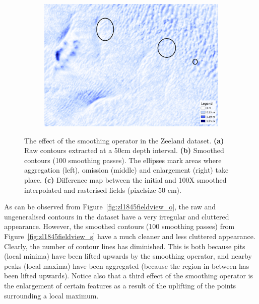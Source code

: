 \begin{figure}
\begin{subfigure}[b]{0.55\linewidth}
    \centering
    \includegraphics[width=\textwidth]{figs/zl1845fieldview_raster_d.pdf}
    \caption{}\label{fig:zl1845fieldview_raster_d}
  \end{subfigure}
  \quad
  \caption{The effect of the smoothing operator in the Zeeland dataset. \textbf{(a)} Raw contours extracted at a 50cm depth interval. \textbf{(b)} Smoothed contours (100 smoothing passes). The ellipses mark areas where aggregation (left), omission (middle) and enlargement (right) take place. \textbf{(c)} Difference map between the initial and 100X smoothed interpolated and rasterised fields (pixelsize 50 cm).}
\label{fig:zl1845fieldview}
\end{figure}
As can be observed from Figure~\ref{fig:zl1845fieldview_o}, the raw and ungeneralised contours in the dataset have a very irregular and cluttered appearance. 
However, the smoothed contours (100 smoothing passes) from Figure~\ref{fig:zl1845fieldview_s} have a much cleaner and less cluttered appearance. 
Clearly, the number of contour lines has diminished. 
This is both because pits (local minima) have been lifted upwards by the smoothing operator, and nearby peaks (local maxima) have been aggregated (because the region in-between has been lifted upwards). 
Notice also that a third effect of the smoothing operator is the enlargement of certain features as a result of the uplifting of the points surrounding a local maximum. 

